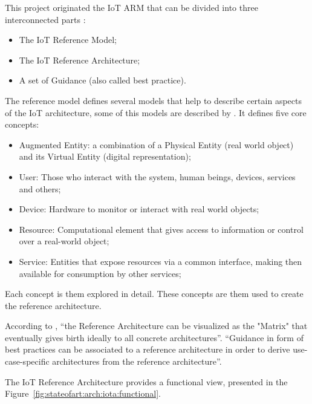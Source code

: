 This project originated the \gls{IoT} \gls{ARM} that can be divided into three interconnected parts \parencite{krvco2014designing}:

\begin{itemize}
    \item The IoT Reference Model;
    \item The IoT Reference Architecture;
    \item A set of Guidance (also called best practice).
\end{itemize}

The reference model defines several models that help to describe certain aspects of the \gls{IoT} architecture, some of this models are described by \cite{6682101}. It defines five core concepts:

\begin{itemize}
    \item Augmented Entity: a combination of a Physical Entity (real world object) and its Virtual Entity (digital representation);
    \item User: Those who interact with the system, human beings, devices, services and others;
    \item Device: Hardware to monitor or interact with real world objects;
    \item Resource: Computational element that gives access to information or control over a real-world object;
    \item Service: Entities that expose resources via a common interface, making then available for consumption by other services;
\end{itemize}

Each concept is them explored in detail. These concepts are them used to create the reference architecture.

According to , ``the Reference Architecture can be visualized as the "Matrix" that eventually gives birth ideally to all concrete architectures''. ``Guidance in form of best practices can be associated to a reference architecture in order to derive use-case-specific architectures from the reference architecture''.

The IoT Reference Architecture provides a functional view, presented in the Figure~\ref{fig:stateofart:arch:iota:functional}.

